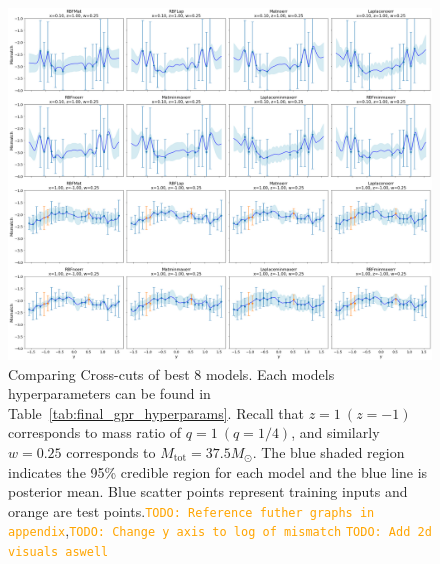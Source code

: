 \documentclass{ucdgradtaughtthesis}
\newcommand{\todo}[1]{\textcolor{orange}{\texttt{TODO: #1}}}
\begin{document}
\begin{figure}[H]
    \centering
    \includegraphics[width=1\textwidth]{LatexPlots/final_gps_plots/gps_crosscuts_bestmodels.png}
    \caption[Comparing Cross-cuts of best 8 models.]{Comparing Cross-cuts of best 8 models. Each models hyperparameters can be found in Table~\ref{tab:final_gpr_hyperparams}. 
    Recall that $z=1\ (z=-1)$ corresponds to mass ratio of $q=1\ (q=1/4)$, and similarly $w=0.25$ corresponds to $M_\text{tot}=37.5M_\odot$. The blue shaded region indicates the 95\% credible region for each model
    and the blue line is posterior mean. Blue scatter points represent training inputs and orange are test points.\todo{Reference futher graphs in appendix},\todo{Change y axis to log of mismatch}
    \todo{Add 2d visuals aswell}}
    \label{fig:crosscuts_bestmodels}
\end{figure}
\end{document}
